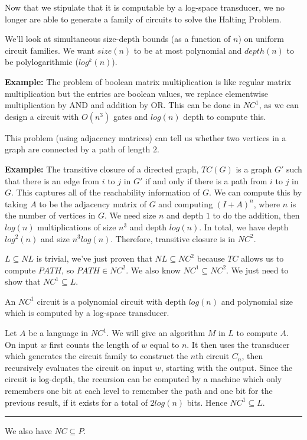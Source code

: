 \documentclass[twoside]{article}
\newenvironment{proof}{{\bf Proof:}}{\hfill\rule{2mm}{2mm}}
\begin{document}

Now that we stipulate that it is computable by a log-space transducer, we no longer are able to generate a family of circuits to solve the Halting Problem. 

We'll look at simultaneous size-depth bounds (as a function of $n$) on uniform circuit families.  We want $size(n)$ to be at most polynomial and $depth(n)$ to be polylogarithmic ($log^k(n)$).


\textbf{Example:} The problem of boolean matrix multiplication is like regular matrix multiplication but the entries are boolean values, we replace elementwise multiplication by AND and addition by OR.  This can be done in $NC^1$, as we can design a circuit with $O(n^3)$ gates and $log(n)$ depth to compute this.

This problem (using adjacency matrices) can tell us whether two vertices in a graph are connected by a path of length $2$.

\textbf{Example:} The transitive closure of a directed graph, $TC(G)$ is a graph $G'$ such that there is an edge from $i$ to $j$ in $G'$ if and only if there is a path from $i$ to $j$ in $G$.  This captures all of the reachability information of $G$.  We can compute this by taking $A$ to be the adjacency matrix of $G$ and computing $(I+A)^n$, where $n$ is the number of vertices in $G$.  We need size $n$ and depth $1$ to do the addition, then $log(n)$ multiplications of size $n^3$ and depth $log(n)$.  In total, we have depth $log^2(n)$ and size $n^3log(n)$.  Therefore, transitive closure is in $NC^2$.


\begin{proof}
	$L\subseteq NL$ is trivial, we've just proven that $NL\subseteq NC^2$ because $TC$ allows us to compute $PATH$, so $PATH\in NC^2$.  We also know $NC^1\subseteq NC^2$.  We just need to show that $NC^1\subseteq L$.
	
	An $NC^1$ circuit is a polynomial circuit with depth $log(n)$ and polynomial size which is computed by a log-space transducer.  
	
	Let $A$ be a language in $NC^1$.  We will give an algorithm $M$ in $L$ to compute $A$.  On input $w$ first counts the length of $w$ equal to $n$.  It then uses the transducer which generates the circuit family to construct the $n$th circuit $C_n$, then recursively evaluates the circuit on input $w$, starting with the output.  Since the circuit is log-depth, the recursion can be computed by a machine which only remembers one bit at each level to remember the path and one bit for the previous result, if it exists for a total of $2log(n)$ bits.  Hence $NC^1\subseteq L$.
\end{proof}

We also have $NC\subseteq P$.
\end{document}
